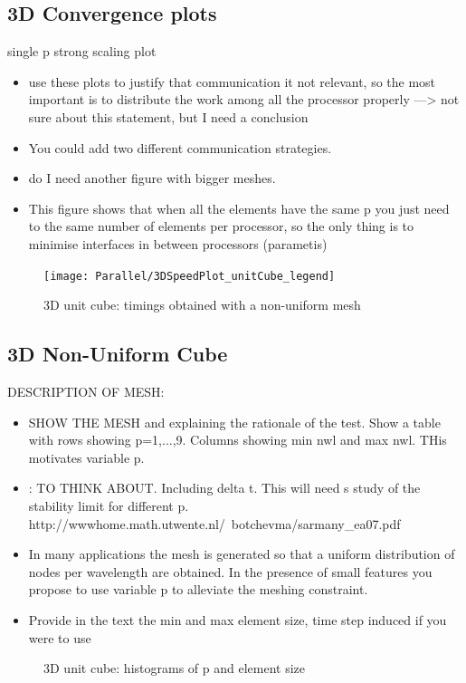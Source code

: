 \subsection{3D Convergence plots}
single p strong scaling plot
\begin{itemize}
\item use these plots to justify that communication it not relevant, so the most important is to distribute the work among all the processor properly ---> not sure about this statement, but I need a conclusion
\item You could add two different communication strategies.
\item do I need another figure with bigger meshes.
\item This figure shows that when all the elements have the same p you just need to the same number of elements per processor, so the only thing is to minimise  interfaces in between processors (parametis)
\end{itemize}
\begin{figure}[!ht]
	\centering
  \texttt{[image: Parallel/3DSpeedPlot\_unitCube\_legend]}
	\caption{3D unit cube: timings obtained with a non-uniform mesh}
	\label{fig:unitCubeNonUniformTimings}
\end{figure}
\clearpage
\subsection{3D Non-Uniform Cube}
DESCRIPTION OF MESH:
\begin{itemize}
\item SHOW THE MESH and explaining the rationale of the test.
Show a table with rows showing p=1,...,9.
Columns showing min nwl and max nwl. THis motivates variable p.
\item: TO THINK ABOUT. Including delta t. This will need s study of the stability limit for different p. http://wwwhome.math.utwente.nl/~botchevma/sarmany_ea07.pdf
\item In many applications the mesh is generated so that a uniform distribution of nodes per wavelength are obtained. In the presence of small features you propose to use variable p to alleviate the meshing constraint.
\item Provide in the text the min and max element size, time step induced if you were to use 
\end{itemize}

\begin{figure}[!ht]
	\centering
\caption{3D unit cube: histograms of p and element size}
	\label{fig:unitCubeNonUniformTimings}
\end{figure}

